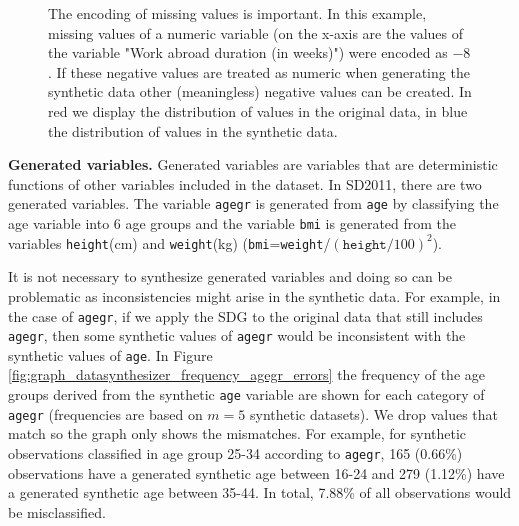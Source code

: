 \documentclass[runningheads]{llncs}
\begin{document}
\begin{figure}[t]
    \centering        
    \caption{The encoding of missing values is important. In this example, missing values of a numeric variable (on the x-axis are the values of the variable "Work abroad duration (in weeks)") were encoded as $-8$. If these negative values are treated as numeric when generating the synthetic data other (meaningless) negative values can be created. In red we display the distribution of values in the original data, in blue the distribution of values in the synthetic data.}\label{fig:graph_datasynthesizer_wkabdur}
    \vspace{-2em}
\end{figure}

{\bf Generated variables.} Generated variables are variables that are deterministic functions of other variables included in the dataset.  In SD2011, there are two generated variables.  The variable \texttt{agegr} is generated from \texttt{age} by classifying the age variable into 6 age groups and the variable \texttt{bmi} is generated from the variables \texttt{height}(cm) and \texttt{weight}(kg) (\texttt{bmi}=\texttt{weight}/$(\texttt{height}/100)^2$).  

It is not necessary to synthesize generated variables and doing so can be problematic as inconsistencies might arise in the synthetic data.  For example, in the case of \texttt{agegr}, if we apply the SDG to the original data that still includes \texttt{agegr}, then some synthetic values of \texttt{agegr} would be inconsistent with the synthetic values of \texttt{age}. In Figure \ref{fig:graph_datasynthesizer_frequency_agegr_errors} the frequency of the age groups derived from the synthetic \texttt{age} variable are shown for each category of \texttt{agegr} (frequencies are based on $m=5$ synthetic datasets). We drop values that match so the graph only shows the mismatches.  For example, for synthetic observations classified in age group 25-34 according to \texttt{agegr}, 165 (0.66\%) observations have a generated synthetic age between 16-24 and 279 (1.12\%) have a generated synthetic age between 35-44.  In total, 7.88\% of all observations would be misclassified.
\end{document}
